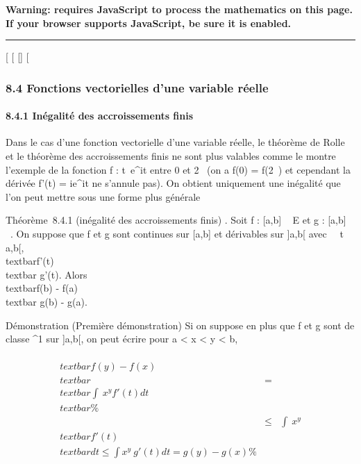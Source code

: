 \textbf{Warning: 
requires JavaScript to process the mathematics on this page.\\ If your
browser supports JavaScript, be sure it is enabled.}

\begin{center}\rule{3in}{0.4pt}\end{center}

{[}
{[}
{[}{]}
{[}

\subsubsection{8.4 Fonctions vectorielles d'une variable réelle}

\paragraph{8.4.1 Inégalité des accroissements finis}

Dans le cas d'une fonction vectorielle d'une variable réelle, le
théorème de Rolle et le théorème des accroissements finis ne sont plus
valables comme le montre l'exemple de la fonction f :
t\mapsto~e^it entre 0 et 2\pi~ (on a f(0) =
f(2\pi~) et cependant la dérivée f'(t) = ie^it ne s'annule pas).
On obtient uniquement une inégalité que l'on peut mettre sous une forme
plus générale

Théorème~8.4.1 (inégalité des accroissements finis) . Soit f : {[}a,b{]}
\rightarrow~ E et g : {[}a,b{]} \rightarrow~ ~. On suppose que f et g sont continues sur
{[}a,b{]} et dérivables sur {]}a,b{[} avec \forall~~t
\in{]}a,b{[}, \\textbar{}f'(t)\\textbar{} \leq
g'(t). Alors \\textbar{}f(b) -
f(a)\\textbar{} \leq g(b) - g(a).

Démonstration (Première démonstration) Si on suppose en plus que f et g
sont de classe ^1 sur {]}a,b{[}, on peut écrire pour a
\textless{} x \textless{} y \textless{} b,

\begin{align*} \\textbar{}f(y) -
f(x)\\textbar{}& =&
\\textbar{}\int ~
x^yf'(t) dt\\textbar{} \%&
\\ & \leq& \int ~
x^y\\textbar{}f'(t)\\textbar{}
dt \leq\int  x^y~g'(t) dt = g(y) -
g(x)\%& \\
\end{align*}

